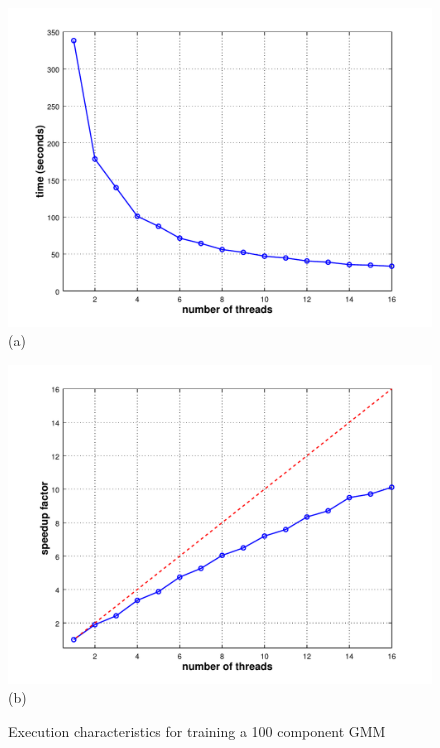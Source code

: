 \begin{figure}[!b]
\centering
\begin{minipage}{1\columnwidth}
  \centering
  \begin{minipage}{0.5\textwidth}
    \centering
    \includegraphics[width=1.1\textwidth]{plot1.pdf}\\
    {(a)}
  \end{minipage}%
  \begin{minipage}{0.5\textwidth}
    \centering
    \includegraphics[width=1.1\textwidth]{plot2.pdf}\\
    {(b)}
  \end{minipage}
\end{minipage}
\caption
  {
  Execution characteristics for training a 100 component GMM
}
\end{figure}
